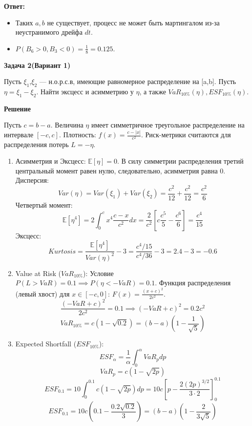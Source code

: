 \documentclass[a4paper,12pt]{extarticle}
\begin{document}
\textbf{Ответ:}
\begin{itemize}
    \item Таких $a,b$ не существует, процесс не может быть мартингалом из-за неустранимого дрейфа $dt$.
    \item $P(B_6 > 0, B_3 < 0) = \frac{1}{8} = 0.125$.
\end{itemize}

\begin{center}
    \textbf{Задача 2(Вариант 1)}
\end{center}
Пусть $\xi_1$,$\xi_2$ — н.о.р.с.в, имеющие равномерное распределение на
[a,b]. Пусть $\eta = \xi_1 - \xi_2$. Найти эксцесс и асимметрию у $\eta$, а также $VaR_{10\%}(\eta), ESF_{10\%}(\eta)$.
\begin{center}
    \textbf{Решение}
\end{center}

Пусть $c = b-a$. Величина $\eta$ имеет симметричное треугольное распределение на интервале $[-c, c]$.
Плотность: $f(x) = \frac{c - |x|}{c^2}$. Риск-метрики считаются для распределения потерь $L = -\eta$.
\begin{enumerate}
    \item Асимметрия и Эксцесс:
    $\mathbb{E}[\eta] = 0$. В силу симметрии распределения третий центральный момент равен нулю, следовательно, асимметрия равна 0.
    Дисперсия:
    $$Var(\eta) = Var(\xi_1) + Var(\xi_2) = \frac{c^2}{12} + \frac{c^2}{12} = \frac{c^2}{6}$$
    Четвертый момент:
    $$\mathbb{E}[\eta^4] = 2 \int_0^c x^4 \frac{c-x}{c^2} dx = \frac{2}{c^2} \left[ c\frac{c^5}{5} - \frac{c^6}{6} \right] = \frac{c^4}{15}$$
    Эксцесс:
    $$Kurtosis = \frac{\mathbb{E}[\eta^4]}{Var(\eta)^2} - 3 = \frac{c^4 / 15}{c^4 / 36} - 3 = 2.4 - 3 = -0.6$$

    \item Value at Risk ($VaR_{10\%}$):
    Условие $P(L > VaR) = 0.1 \implies P(\eta < -VaR) = 0.1$.
    Функция распределения (левый хвост) для $x \in [-c, 0]$: $F(x) = \frac{(x+c)^2}{2c^2}$.
    $$\frac{(-VaR+c)^2}{2c^2} = 0.1 \implies (-VaR+c)^2 = 0.2c^2$$
    $$VaR_{10\%} = c(1 - \sqrt{0.2}) = (b-a)\left(1 - \frac{1}{\sqrt{5}}\right)$$

    \item Expected Shortfall ($ESF_{10\%}$):
    $$ESF_{\alpha} = \frac{1}{\alpha} \int_0^{\alpha} VaR_p dp$$
    $$VaR_p = c(1 - \sqrt{2p})$$
    $$ESF_{0.1} = 10 \int_0^{0.1} c(1 - \sqrt{2p}) dp = 10c \left[ p - \frac{2(2p)^{3/2}}{3\cdot 2} \right]_0^{0.1}$$
    $$ESF_{0.1} = 10c \left( 0.1 - \frac{0.2\sqrt{0.2}}{3} \right) = (b-a)\left(1 - \frac{2}{3\sqrt{5}}\right)$$
\end{enumerate}
\end{document}
